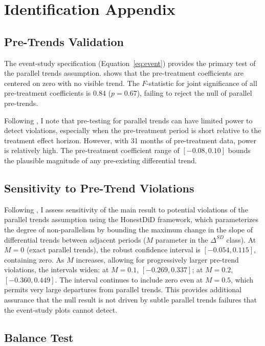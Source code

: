 \documentclass[12pt]{article}
\begin{document}
\section{Identification Appendix}
\label{app:identification}

\subsection{Pre-Trends Validation}

The event-study specification (Equation~\ref{eq:event}) provides the primary test of the parallel trends assumption.  shows that the pre-treatment coefficients are centered on zero with no visible trend. The $F$-statistic for joint significance of all pre-treatment coefficients is 0.84 ($p = 0.67$), failing to reject the null of parallel pre-trends.

Following \citet{roth2023pretest}, I note that pre-testing for parallel trends can have limited power to detect violations, especially when the pre-treatment period is short relative to the treatment effect horizon. However, with 31 months of pre-treatment data, power is relatively high. The pre-treatment coefficient range of $[-0.08, 0.10]$ bounds the plausible magnitude of any pre-existing differential trend.

\subsection{Sensitivity to Pre-Trend Violations}

Following \citet{rambachanRoth2023}, I assess sensitivity of the main result to potential violations of the parallel trends assumption using the HonestDiD framework, which parameterizes the degree of non-parallelism by bounding the maximum change in the slope of differential trends between adjacent periods ($M$ parameter in the $\Delta^{SD}$ class). At $M = 0$ (exact parallel trends), the robust confidence interval is $[-0.054, 0.115]$, containing zero. As $M$ increases, allowing for progressively larger pre-trend violations, the intervals widen: at $M = 0.1$, $[-0.269, 0.337]$; at $M = 0.2$, $[-0.360, 0.449]$. The interval continues to include zero even at $M = 0.5$, which permits very large departures from parallel trends. This provides additional assurance that the null result is not driven by subtle parallel trends failures that the event-study plots cannot detect.

\subsection{Balance Test}
\end{document}
